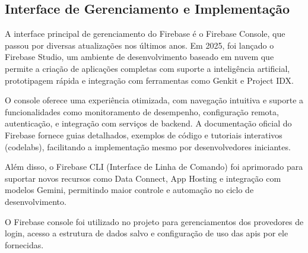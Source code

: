 \subsection{Interface de Gerenciamento e Implementação}

A interface principal de gerenciamento do Firebase é o Firebase Console, que passou por diversas atualizações nos últimos anos. Em 2025, foi lançado o Firebase Studio, um ambiente de desenvolvimento baseado em nuvem que permite a criação de aplicações completas com suporte a inteligência artificial, prototipagem rápida e integração com ferramentas como Genkit e Project IDX\cite{firebase2025releases}.

O console oferece uma experiência otimizada, com navegação intuitiva e suporte a funcionalidades como monitoramento de desempenho, configuração remota, autenticação, e integração com serviços de backend. A documentação oficial do Firebase fornece guias detalhados, exemplos de código e tutoriais interativos (codelabs), facilitando a implementação mesmo por desenvolvedores iniciantes.

Além disso, o Firebase CLI (Interface de Linha de Comando) foi aprimorado para suportar novos recursos como Data Connect, App Hosting e integração com modelos Gemini, permitindo maior controle e automação no ciclo de desenvolvimento.

O Firebase console foi utilizado no projeto para gerenciamentos dos provedores de login, acesso a estrutura de dados salvo e configuração de uso das apis por ele fornecidas.
\begin{comment}
	A operacionalização da plataforma Firebase é mediada por um console web especializado, denominado Firebase Console, que representa a interface principal de gerenciamento e configuração de projetos \cite{google2023console}. Este ambiente de desenvolvimento integrado foi projetado seguindo princípios de experiência do usuário (UX) orientados à simplicidade e intuitividade, proporcionando aos desenvolvedores um fluxo de trabalho otimizado para implementação de recursos.
	
	O processo de utilização inicia-se com a criação de um projeto no console, seguido pela seleção e configuração dos serviços desejados a partir de um catálogo extenso de funcionalidades disponíveis. Cada serviço oferecido pela plataforma é acompanhado de documentação técnica detalhada, incluindo guias de implementação passo-a-passo, exemplos de código e melhores práticas de desenvolvimento \cite{firebase2023implementation}.
	
	A evolução do Firebase reflete a estratégia da Google de oferecer uma solução integrada e escalável para desenvolvedores, permitindo a criação de aplicações robustas com menor complexidade técnica e maior foco na experiência do usuário.
\end{comment}

